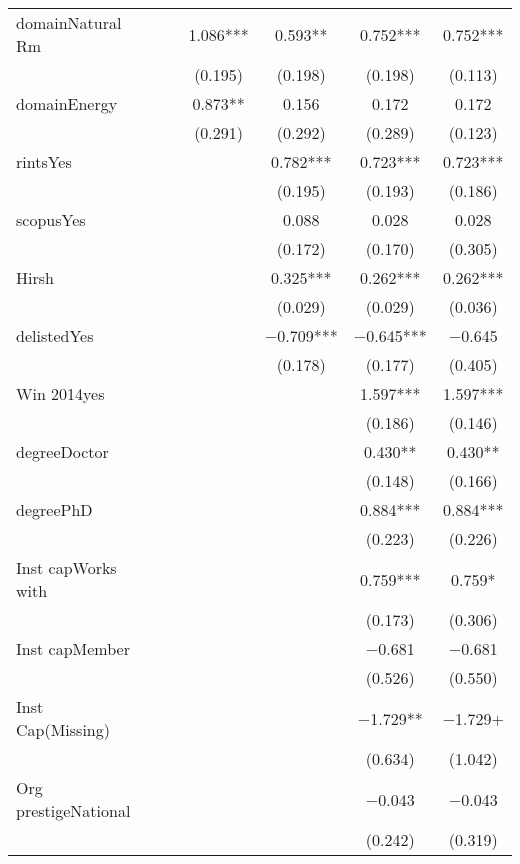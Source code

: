 \begin{table}
\begin{tabular}[t]{lcccccc}
domainNatural Rm &  &  & \num{1.086}*** & \num{0.593}** & \num{0.752}*** & \num{0.752}***\\
 &  &  & (\num{0.195}) & (\num{0.198}) & (\num{0.198}) & (\num{0.113})\\
domainEnergy &  &  & \num{0.873}** & \num{0.156} & \num{0.172} & \num{0.172}\\
 &  &  & (\num{0.291}) & (\num{0.292}) & (\num{0.289}) & (\num{0.123})\\
rintsYes &  &  &  & \num{0.782}*** & \num{0.723}*** & \num{0.723}***\\
 &  &  &  & (\num{0.195}) & (\num{0.193}) & (\num{0.186})\\
scopusYes &  &  &  & \num{0.088} & \num{0.028} & \num{0.028}\\
 &  &  &  & (\num{0.172}) & (\num{0.170}) & (\num{0.305})\\
Hirsh &  &  &  & \num{0.325}*** & \num{0.262}*** & \num{0.262}***\\
 &  &  &  & (\num{0.029}) & (\num{0.029}) & (\num{0.036})\\
delistedYes &  &  &  & \num{-0.709}*** & \num{-0.645}*** & \num{-0.645}\\
 &  &  &  & (\num{0.178}) & (\num{0.177}) & (\num{0.405})\\
Win 2014yes &  &  &  &  & \num{1.597}*** & \num{1.597}***\\
 &  &  &  &  & (\num{0.186}) & (\num{0.146})\\
degreeDoctor &  &  &  &  & \num{0.430}** & \num{0.430}**\\
 &  &  &  &  & (\num{0.148}) & (\num{0.166})\\
degreePhD &  &  &  &  & \num{0.884}*** & \num{0.884}***\\
 &  &  &  &  & (\num{0.223}) & (\num{0.226})\\
Inst capWorks with &  &  &  &  & \num{0.759}*** & \num{0.759}*\\
 &  &  &  &  & (\num{0.173}) & (\num{0.306})\\
Inst capMember &  &  &  &  & \num{-0.681} & \num{-0.681}\\
 &  &  &  &  & (\num{0.526}) & (\num{0.550})\\
Inst Cap(Missing) &  &  &  &  & \num{-1.729}** & \num{-1.729}+\\
 &  &  &  &  & (\num{0.634}) & (\num{1.042})\\
Org prestigeNational &  &  &  &  & \num{-0.043} & \num{-0.043}\\
 &  &  &  &  & (\num{0.242}) & (\num{0.319})\\

\end{tabular}
\end{table}
